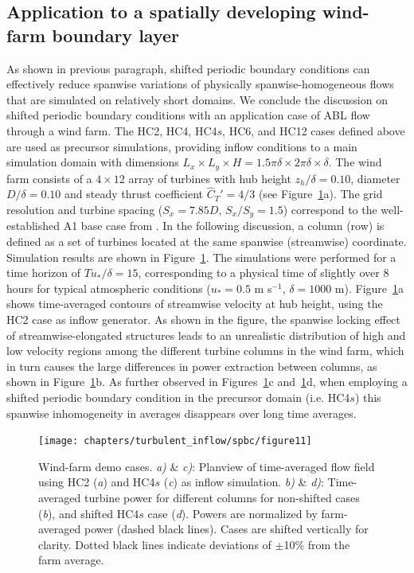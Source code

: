 	\subsection{Application to a spatially developing wind-farm boundary layer}\label{sec:inflow_shifted_demo}
	As shown in previous paragraph, shifted periodic boundary conditions can effectively reduce spanwise variations of physically spanwise-homogeneous flows that are simulated on relatively short domains. We conclude the discussion on shifted periodic boundary conditions with an application case of ABL flow through a wind farm. The HC2, HC4, HC4$s$, HC6, and HC12 cases defined above are used as precursor simulations, providing inflow conditions to a main simulation domain with dimensions $L_x \times L_y \times H = 1.5\pi \delta \times 2\pi \delta \times \delta$. The wind farm consists of a $4 \times 12$ array of turbines with hub height $z_h/\delta = 0.10$, diameter $D/\delta = 0.10$ and steady thrust coefficient $\widehat{C}_T' = 4/3$ (see Figure~\ref{fig:WF}a). The grid resolution and turbine spacing ($S_x = 7.85D$, $S_x/S_y = 1.5$) correspond to the well-established A1 base case from \cite{calaf2010large}. In the following discussion, a column (row) is defined as a set of turbines located at the same spanwise (streamwise) coordinate.
	Simulation results are shown in Figure~\ref{fig:WF}. The simulations were performed for a time horizon of $Tu_*/\delta = 15$, corresponding to a physical time of slightly over 8 hours for typical atmospheric conditions ($u_* = 0.5$ m s$^{-1}$, $\delta = 1000$ m). Figure~\ref{fig:WF}a shows time-averaged contours of streamwise velocity at hub height, using the HC2 case as inflow generator. As shown in the figure, the spanwise locking effect of streamwise-elongated structures leads to an unrealistic distribution of high and low velocity regions among the different turbine columns in the wind farm, which in turn causes the large differences in power extraction between columns, as shown in Figure~\ref{fig:WF}b. As further observed in Figures~\ref{fig:WF}c and~\ref{fig:WF}d, when employing a shifted periodic boundary condition in the precursor domain (i.e. HC4$s$) this spanwise inhomogeneity in averages disappears over long time averages. 
	
	\begin{figure}
		\centering
		\texttt{[image: chapters/turbulent\_inflow/spbc/figure11]}
		\caption[Wind-farm demo cases for shifted periodic boundary conditions.]{Wind-farm demo cases. \emph{a)} \& \emph{c)}: Planview of time-averaged flow field using HC2 (\emph{a}) and HC4$s$ (\emph{c}) as inflow simulation. \emph{b)} \& \emph{d)}: Time-averaged turbine power for different columns for non-shifted cases (\emph{b}), and shifted HC4$s$ case (\emph{d}). Powers are normalized by farm-averaged power (dashed black lines). Cases are shifted vertically for clarity. Dotted black lines indicate deviations of $\pm$10\% from the farm average.}
		\label{fig:WF}
	\end{figure}
	
